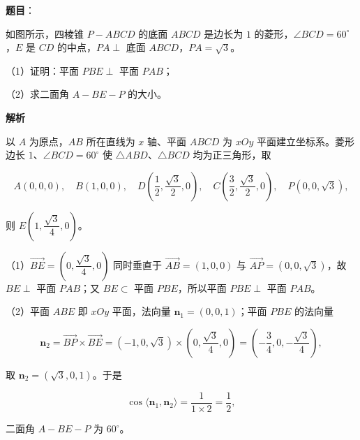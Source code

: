 \begin{answer}

\textbf{题目}：

如图所示，四棱锥 $P-ABCD$ 的底面 $ABCD$ 是边长为 $1$ 的菱形，$\angle BCD=60^\circ$，$E$ 是 $CD$ 的中点，$PA\perp$ 底面 $ABCD$，$PA=\sqrt3$。

（1）证明：平面 $PBE\perp$ 平面 $PAB$；

（2）求二面角 $A-BE-P$ 的大小。
\nopagebreak[4]
\begin{center}\end{center}
\nopagebreak[4]
\textbf{解析}

以 $A$ 为原点，$AB$ 所在直线为 $x$ 轴、平面 $ABCD$ 为 $xOy$ 平面建立坐标系。菱形边长 $1$、$\angle BCD=60^\circ$ 使 $\triangle ABD$、$\triangle BCD$ 均为正三角形，取

\nopagebreak[4]
\[A(0,0,0),\quad B(1,0,0),\quad D\left(\frac12,\frac{\sqrt3}2,0\right),\quad C\left(\frac32,\frac{\sqrt3}2,0\right),\quad P(0,0,\sqrt3),\]

则 $E\left(1,\dfrac{\sqrt3}4,0\right)$。

（1）$\overrightarrow{BE}=\left(0,\dfrac{\sqrt3}4,0\right)$ 同时垂直于 $\overrightarrow{AB}=(1,0,0)$ 与 $\overrightarrow{AP}=(0,0,\sqrt3)$，故 $BE\perp$ 平面 $PAB$；又 $BE\subset$ 平面 $PBE$，所以平面 $PBE\perp$ 平面 $PAB$。

（2）平面 $ABE$ 即 $xOy$ 平面，法向量 $\boldsymbol n_1=(0,0,1)$；平面 $PBE$ 的法向量

\nopagebreak[4]
\[\boldsymbol n_2=\overrightarrow{BP}\times\overrightarrow{BE}=(-1,0,\sqrt3)\times\left(0,\frac{\sqrt3}4,0\right)=\left(-\frac34,0,-\frac{\sqrt3}4\right),\]

取 $\boldsymbol n_2=(\sqrt3,0,1)$。于是

\nopagebreak[4]
\[\cos\langle\boldsymbol n_1,\boldsymbol n_2\rangle=\frac{1}{1\times2}=\frac12,\]

二面角 $A-BE-P$ 为 $60^\circ$。


\end{answer}
